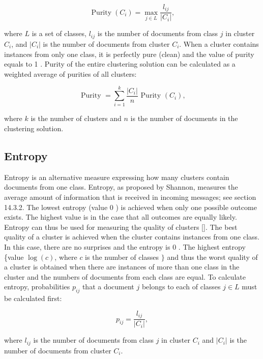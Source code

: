 \begin{equation*}
\operatorname{Purity}\left(C_{i}\right)=\max _{j \in L} \frac{l_{i j}}{\left|C_{i}\right|}, \tag{12.40}
\end{equation*}


where $L$ is a set of classes, $l_{i j}$ is the number of documents from class $j$ in cluster $C_{i}$, and $\left|C_{i}\right|$ is the number of documents from cluster $C_{i}$. When a cluster contains instances from only one class, it is perfectly pure (clean) and the value of purity equals to 1 . Purity of the entire clustering solution can be calculated as a weighted average of purities of all clusters:


\begin{equation*}
\text { Purity }=\sum_{i=1}^{k} \frac{\left|C_{i}\right|}{n} \text { Purity }\left(C_{i}\right), \tag{12.41}
\end{equation*}


where $k$ is the number of clusters and $n$ is the number of documents in the clustering solution.


\subsection{Entropy}
Entropy is an alternative measure expressing how many clusters contain documents from one class. Entropy, as proposed by Shannon, measures the average amount of information that is received in incoming messages; see section 14.3.2. The lowest entropy (value 0 ) is achieved when only one possible outcome exists. The highest value is in the case that all outcomes are equally likely. Entropy can thus be used for measuring the quality of clusters [\cite{ref256}]. The best quality of a cluster is achieved when the cluster contains instances from one class. In this case, there are no surprises and the entropy is 0 . The highest entropy \{value $\log (c)$, where $c$ is the number of classes $\}$ and thus the worst quality of a cluster is obtained when there are instances of more than one class in the cluster and the numbers of documents from each class are equal. To calculate entropy, probabilities $p_{i j}$ that a document $j$ belongs to each of classes $j \in L$ must be calculated first:


\begin{equation*}
p_{i j}=\frac{l_{i j}}{\left|C_{i}\right|}, \tag{12.42}
\end{equation*}


where $l_{i j}$ is the number of documents from class $j$ in cluster $C_{i}$ and $\left|C_{i}\right|$ is the number of documents from cluster $C_{i}$.

